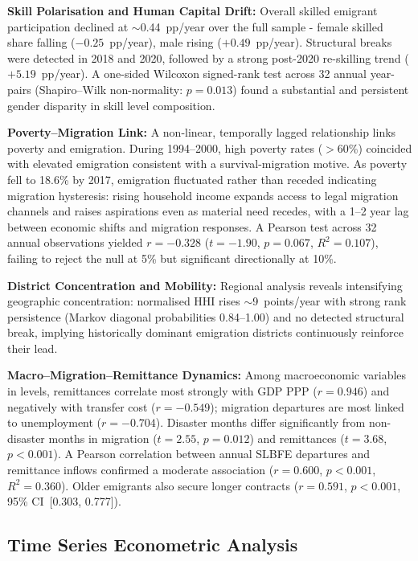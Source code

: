 \documentclass[sigconf]{acmart}
\begin{document}
\noindent\textbf{Skill Polarisation and Human Capital Drift:}
Overall skilled emigrant participation declined at $\sim$0.44~pp/year over the full sample - female skilled share falling ($-0.25$~pp/year), male rising ($+0.49$~pp/year). Structural breaks were detected in 2018 and 2020, followed by a strong post-2020 re-skilling trend ($+5.19$~pp/year). A one-sided Wilcoxon signed-rank test across 32 annual year-pairs (Shapiro--Wilk non-normality: $p=0.013$) found a substantial and persistent gender disparity in skill level composition. 

\noindent\textbf{Poverty--Migration Link:}
A non-linear, temporally lagged relationship links poverty and emigration. During 1994--2000, high poverty rates ($>$60\%) coincided with elevated emigration consistent with a survival-migration motive. As poverty fell to 18.6\% by 2017, emigration fluctuated rather than receded indicating migration hysteresis: rising household income expands access to legal migration channels and raises aspirations even as material need recedes, with a 1--2 year lag between economic shifts and migration responses. A Pearson test across 32 annual observations yielded $r=-0.328$ ($t=-1.90$, $p=0.067$, $R^2=0.107$), failing to reject the null at 5\% but significant directionally at 10\%.

\noindent\textbf{District Concentration and Mobility:}
Regional analysis reveals intensifying geographic concentration: normalised HHI rises $\sim$9~points/year with strong rank persistence (Markov diagonal probabilities 0.84--1.00) and no detected structural break, implying historically dominant emigration districts continuously reinforce their lead.

\noindent\textbf{Macro--Migration--Remittance Dynamics:}
Among macroeconomic variables in levels, remittances correlate most strongly with GDP PPP ($r=0.946$) and negatively with transfer cost ($r=-0.549$); migration departures are most linked to unemployment ($r=-0.704$). Disaster months differ significantly from non-disaster months in migration ($t=2.55$, $p=0.012$) and remittances ($t=3.68$, $p<0.001$). A Pearson correlation between annual SLBFE departures and remittance inflows confirmed a moderate association ($r=0.600$, $p<0.001$, $R^2=0.360$). Older emigrants also secure longer contracts ($r=0.591$, $p<0.001$, 95\% CI~[0.303, 0.777]).

\subsection{Time Series Econometric Analysis}
\end{document}
